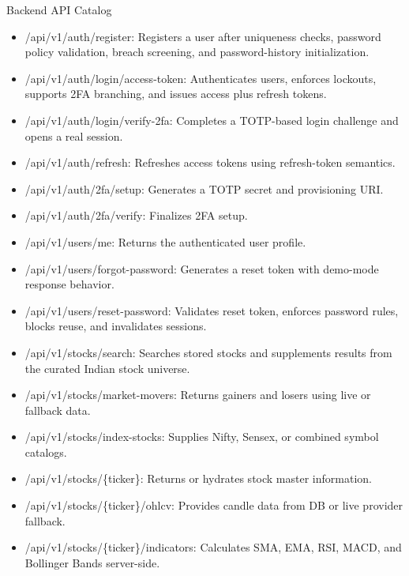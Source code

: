 \documentclass{beamer}
\begin{document}
\begin{frame}{Backend API Catalog}
\begin{itemize}
\item /api/v1/auth/register: Registers a user after uniqueness checks, password policy validation, breach screening, and password-history initialization.
\item /api/v1/auth/login/access-token: Authenticates users, enforces lockouts, supports 2FA branching, and issues access plus refresh tokens.
\item /api/v1/auth/login/verify-2fa: Completes a TOTP-based login challenge and opens a real session.
\item /api/v1/auth/refresh: Refreshes access tokens using refresh-token semantics.
\item /api/v1/auth/2fa/setup: Generates a TOTP secret and provisioning URI.
\item /api/v1/auth/2fa/verify: Finalizes 2FA setup.
\item /api/v1/users/me: Returns the authenticated user profile.
\item /api/v1/users/forgot-password: Generates a reset token with demo-mode response behavior.
\item /api/v1/users/reset-password: Validates reset token, enforces password rules, blocks reuse, and invalidates sessions.
\item /api/v1/stocks/search: Searches stored stocks and supplements results from the curated Indian stock universe.
\item /api/v1/stocks/market-movers: Returns gainers and losers using live or fallback data.
\item /api/v1/stocks/index-stocks: Supplies Nifty, Sensex, or combined symbol catalogs.
\item /api/v1/stocks/\{ticker\}: Returns or hydrates stock master information.
\item /api/v1/stocks/\{ticker\}/ohlcv: Provides candle data from DB or live provider fallback.
\item /api/v1/stocks/\{ticker\}/indicators: Calculates SMA, EMA, RSI, MACD, and Bollinger Bands server-side.
\end{itemize}
\end{frame}
\end{document}
